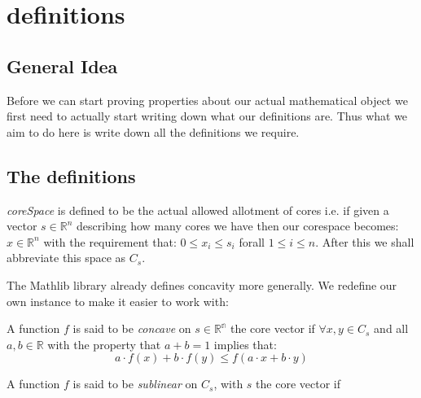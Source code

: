\chapter{definitions}\label{ch_definitions}

\section{General Idea}
Before we can start proving properties about our actual mathematical object we first need to actually
start writing down what our definitions are. Thus what we aim to do here is write down all the definitions
we require.

\section{The definitions}

\begin{definition}\label{BSC.corespace}\leanok
   \textit{coreSpace} is defined to be the actual allowed allotment of cores i.e. if given a vector
   $s \in \mathbb{R}^n$ describing how many cores we have then our corespace becomes:
   $x \in \mathbb{R}^n$ with the requirement that: $0 \leq x_i \leq s_i$ forall $1 \leq i \leq n$.
   After this we shall abbreviate this space as $C_s$.
\end{definition}

The Mathlib library already defines concavity more generally. We redefine our own instance to make
it easier to work with:
\begin{definition}\label{BSC.myConcave}\leanok
  A function $f$ is said to be \textit{concave} on $s \in \mathbb{R^n}$ the core vector if $\forall x, y \in C_s$
  and all $a, b \in \mathbb{R}$ with the property that $a + b = 1$ implies that:
  $$a \cdot f(x) + b \cdot f(y) \leq f(a \cdot x + b \cdot y)$$
\end{definition}

\begin{definition}\label{BSC.Sublinear}\leanok
  A function $f$ is said to be \textit{sublinear} on $C_s$, with $s$ the core vector if
\end{definition}
